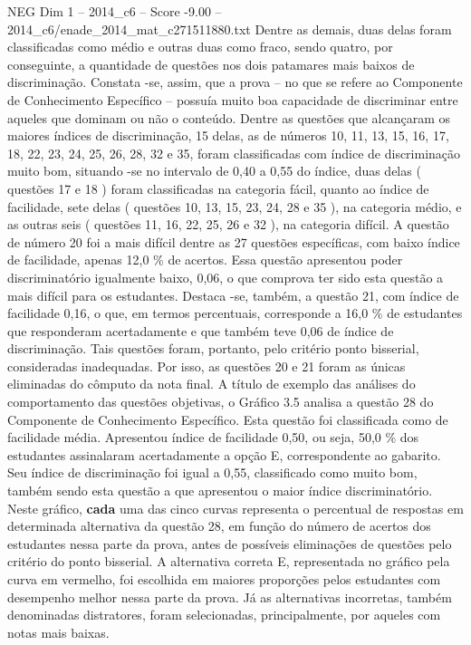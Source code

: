 \begin{textsample}{NEG Dim 1 – 2014\_c6 – Score -9.00 – 2014\_c6/enade\_2014\_mat\_c271511880.txt}
Dentre as demais, duas delas foram classificadas como médio e outras duas como fraco, sendo quatro, por conseguinte, a quantidade de questões nos dois patamares mais baixos de discriminação.
Constata -se, assim, que a prova – no que se refere ao Componente de Conhecimento Específico – possuía muito boa capacidade de discriminar entre aqueles que dominam ou não o conteúdo.
Dentre as questões que alcançaram os maiores índices de discriminação, 15 delas, as de números 10, 11, 13, 15, 16, 17, 18, 22, 23, 24, 25, 26, 28, 32 e 35, foram classificadas com índice de discriminação muito bom, situando -se no intervalo de 0,40 a 0,55 do índice, duas delas ( questões 17 e 18 ) foram classificadas na categoria fácil, quanto ao índice de facilidade, sete delas ( questões 10, 13, 15, 23, 24, 28 e 35 ), na categoria médio, e as outras seis ( questões 11, 16, 22, 25, 26 e 32 ), na categoria difícil.
A questão de número 20 foi a mais difícil dentre as 27 questões específicas, com baixo índice de facilidade, apenas 12,0 \% de acertos.
Essa questão apresentou poder discriminatório igualmente baixo, 0,06, o que comprova ter sido esta questão a mais difícil para os estudantes.
Destaca -se, também, a questão 21, com índice de facilidade 0,16, o que, em termos percentuais, corresponde a 16,0 \% de estudantes que responderam acertadamente e que também teve 0,06 de índice de discriminação.
Tais questões foram, portanto, pelo critério ponto bisserial, consideradas inadequadas.
Por isso, as questões 20 e 21 foram as únicas eliminadas do cômputo da nota final.
A título de exemplo das análises do comportamento das questões objetivas, o Gráfico 3.5 analisa a questão 28 do Componente de Conhecimento Específico.
Esta questão foi classificada como de facilidade média.
Apresentou índice de facilidade 0,50, ou seja, 50,0 \% dos estudantes assinalaram acertadamente a opção E, correspondente ao gabarito.
Seu índice de discriminação foi igual a 0,55, classificado como muito bom, também sendo esta questão a que apresentou o maior índice discriminatório.
Neste gráfico, \textbf{cada} uma das cinco curvas representa o percentual de respostas em determinada alternativa da questão 28, em função do número de acertos dos estudantes nessa parte da prova, antes de possíveis eliminações de questões pelo critério do ponto bisserial.
A alternativa correta E, representada no gráfico pela curva em vermelho, foi escolhida em maiores proporções pelos estudantes com desempenho melhor nessa parte da prova.
Já as alternativas incorretas, também denominadas distratores, foram selecionadas, principalmente, por aqueles com notas mais baixas.

\end{textsample}
